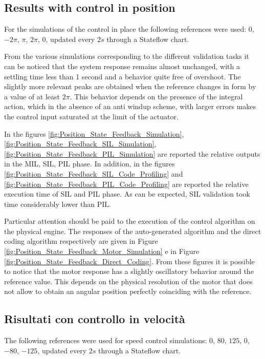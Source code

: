 \documentclass[11pt,a4paper,oneside]{extarticle}
\begin{document}
\subsection{Results with control in position}
For the simulations of the control in place the following references 
were used: $0$, $-2\pi$, $\pi$, $2\pi$, $0$, updated every $2s$ 
through a Stateflow chart. \bigskip

From the various simulations corresponding to the different validation
tasks it can be noticed that the system response remains almost 
unchanged, with a settling time less than 1 second and a behavior 
quite free of overshoot. The slightly more relevant peaks are 
obtained when the reference changes in form by a value of at least 
$2 \pi$. This behavior depends on the presence of the integral action,
which in the absence of an anti windup scheme, with larger errors 
makes the control input saturated at the limit of the actuator. 
\bigskip

In the figures \ref{fig:Position_State_Feedback_Simulation}, 
\ref{fig:Position_State_Feedback_SIL_Simulation}, 
\ref{fig:Position_State_Feedback_PIL_Simulation} are reported 
the relative outputs  in the MIL, 
SIL, PIL phase. In addition, in the figures  
\ref{fig:Position_State_Feedback_SIL_Code_Profiling} and
\ref{fig:Position_State_Feedback_PIL_Code_Profiling} are reported 
the relative execution time of SIL and PIL phase. 
As can be expected, SIL validation took time 
considerably lower than PIL.\bigskip

Particular attention should be paid to the execution of the control 
algorithm on the physical engine. The responses of the auto-generated 
algorithm and the direct coding algorithm respectively are given in 
Figure \ref{fig:Position_State_Feedback_Motor_Simulation} e in Figure 
\ref{fig:Position_State_Feedback_Direct_Coding}. 
From these figures it is possible to notice that the motor response 
has a slightly oscillatory behavior around the reference value. This 
depends on the physical resolution of the motor that does not allow 
to obtain an angular position perfectly coinciding with the reference.

\subsection{Risultati con controllo in velocità}
The following references were used for speed control simulations: 
$0$, $80$, $125$, $0$, $-80$, $-125$, updated every $2s$ 
through a Stateflow chart. \bigskip
\end{document}
